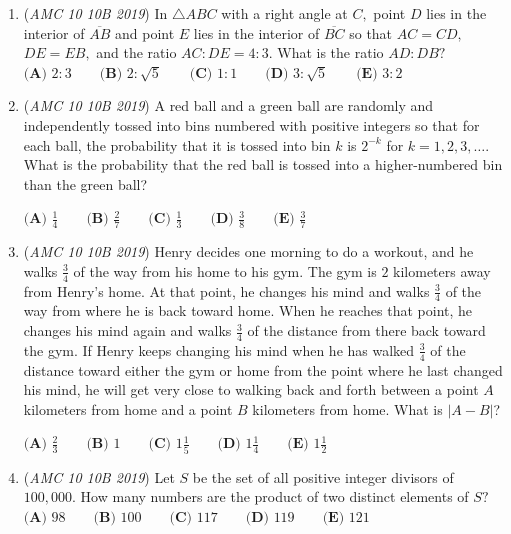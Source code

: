 \begin{enumerate}
 $\textbf{(A) } \frac{28}{3} \qquad\textbf{(B) }10\qquad\textbf{(C) } \frac{32}{3} \qquad\textbf{(D) } \frac{34}{3} \qquad\textbf{(E) }12$


	\item (\textit{AMC 10 10B 2019}) In $\triangle ABC$ with a right angle at $C,$ point $D$ lies in the interior of $\overline{AB}$ and point $E$ lies in the interior of $\overline{BC}$ so that $AC=CD,$ $DE=EB,$ and the ratio $AC:DE=4:3.$ What is the ratio $AD:DB?$
$\textbf{(A) } 2:3 \qquad\textbf{(B) } 2:\sqrt{5} \qquad\textbf{(C) } 1:1 \qquad\textbf{(D) } 3:\sqrt{5} \qquad\textbf{(E) } 3:2$


	\item (\textit{AMC 10 10B 2019}) A red ball and a green ball are randomly and independently tossed into bins numbered with positive integers so that for each ball, the probability that it is tossed into bin $k$ is $2^{-k}$ for $k=1,2,3,\ldots.$ What is the probability that the red ball is tossed into a higher-numbered bin than the green ball?


 $\textbf{(A) } \frac{1}{4} \qquad\textbf{(B) } \frac{2}{7} \qquad\textbf{(C) } \frac{1}{3} \qquad\textbf{(D) } \frac{3}{8} \qquad\textbf{(E) } \frac{3}{7}$


	\item (\textit{AMC 10 10B 2019}) Henry decides one morning to do a workout, and he walks $\frac{3}{4}$ of the way from his home to his gym. The gym is $2$ kilometers away from Henry's home. At that point, he changes his mind and walks $\frac{3}{4}$ of the way from where he is back toward home. When he reaches that point, he changes his mind again and walks $\frac{3}{4}$ of the distance from there back toward the gym. If Henry keeps changing his mind when he has walked $\frac{3}{4}$ of the distance toward either the gym or home from the point where he last changed his mind, he will get very close to walking back and forth between a point $A$ kilometers from home and a point $B$ kilometers from home. What is $|A-B|$?


 $\textbf{(A) } \frac{2}{3} \qquad \textbf{(B) } 1 \qquad \textbf{(C) } 1\frac{1}{5} \qquad \textbf{(D) } 1\frac{1}{4} \qquad \textbf{(E) } 1\frac{1}{2}$


	\item (\textit{AMC 10 10B 2019}) Let $S$ be the set of all positive integer divisors of $100,000.$ How many numbers are the product of two distinct elements of $S?$
$\textbf{(A) }98\qquad\textbf{(B) }100\qquad\textbf{(C) }117\qquad\textbf{(D) }119\qquad\textbf{(E) }121$



\end{enumerate}
